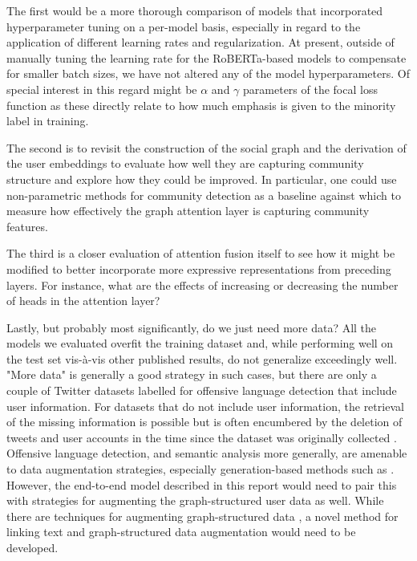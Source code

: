 \documentclass[letterpaper]{article} %
\begin{document}
The first would be a more thorough comparison of models that incorporated hyperparameter tuning on a per-model basis, especially in regard to the application of different learning rates and regularization. At present, outside of manually tuning the learning rate for the RoBERTa-based models to compensate for smaller batch sizes, we have not altered any of the model hyperparameters. Of special interest in this regard might be $\alpha$ and $\gamma$ parameters of the focal loss function as these directly relate to how much emphasis is given to the minority label in training. 

The second is to revisit the construction of the social graph and the derivation of the user embeddings to evaluate how well they are capturing community structure and explore how they could be improved. In particular, one could use non-parametric methods for community detection as a baseline against which to measure how effectively the graph attention layer is capturing community features. 

The third is a closer evaluation of attention fusion itself to see how it might be modified to better incorporate more expressive representations from preceding layers. For instance, what are the effects of increasing or decreasing the number of heads in the attention layer?

Lastly, but probably most significantly, do we just need more data? All the models we evaluated overfit the training dataset and, while performing well on the test set vis-\`a-vis other published results, do not generalize exceedingly well. "More data" is generally a good strategy in such cases, but there are only a couple of Twitter datasets labelled for offensive language detection that include user information. For datasets that do not include user information, the retrieval of the missing information is possible but is often encumbered by the deletion of tweets and user accounts in the time since the dataset was originally collected \citep{Mishra2018}. Offensive language detection, and semantic analysis more generally, are amenable to data augmentation strategies, especially generation-based methods such as \citet{liu2020}. However, the end-to-end model described in this report would need to pair this with strategies for augmenting the graph-structured user data as well. While there are techniques for augmenting graph-structured data \citep{zhao2022}, a novel method for linking text and graph-structured data augmentation would need to be developed.

\appendix


\end{document}
